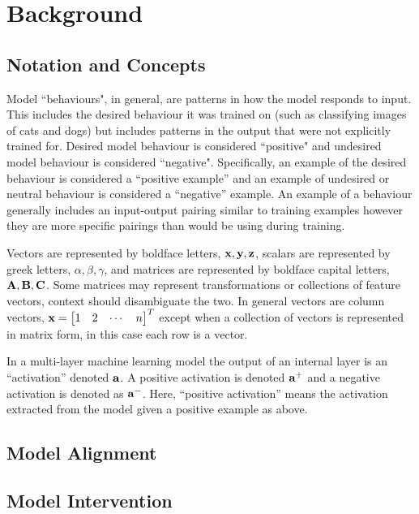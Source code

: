 \chapter{Background}

\section{Notation and Concepts}

Model ``behaviours", in general, are patterns in how the model responds to input.
This includes the desired behaviour it was trained on (such as classifying images of cats and dogs) but includes patterns in the output that were not explicitly trained for.
Desired model behaviour is considered ``positive" and undesired model behaviour is considered ``negative".
Specifically, an example of the desired behaviour is considered a ``positive example'' and an example of undesired or neutral behaviour is considered a ``negative'' example.
An example of a behaviour generally includes an input-output pairing similar to training examples however they are more specific pairings than would be using during training.

Vectors are represented by boldface letters, $\mathbf{x}, \mathbf{y}, \mathbf{z}$, scalars are represented by greek letters, $\alpha, \beta, \gamma$, and matrices are represented by boldface capital letters, $\mathbf{A}, \mathbf{B}, \mathbf{C}$.
Some matrices may represent transformations or collections of feature vectors, context should disambiguate the two.
In general vectors are column vectors, $\vx = \begin{bmatrix*}
    1 & 2 & \cdots & n
\end{bmatrix*}^T$ except when a collection of vectors is represented in matrix form, in this case each row is a vector.

In a multi-layer machine learning model the output of an internal layer is an ``activation'' denoted $\mathbf{a}$.
A positive activation is denoted $\mathbf{a}^+$ and a negative activation is denoted as $\mathbf{a}^-$. Here, ``positive activation'' means the activation extracted from the model given a positive example as above.

\section{Model Alignment}

\section{Model Intervention}


